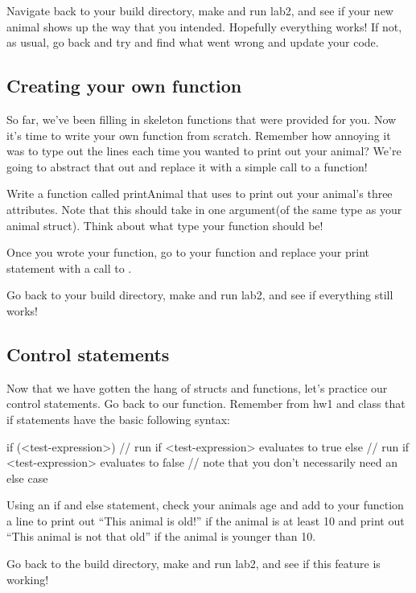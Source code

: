 \documentclass{tufte-handout}
\begin{document}
Navigate back to your build directory, make and run lab2, and see if your new animal shows up the way that you intended.  Hopefully everything works!  If not, as usual, go back and try and find what went wrong and update your code. 



\subsection{Creating your own function}
So far, we've been filling in skeleton functions that were provided for you. Now it's time to write your own function from scratch.  Remember how annoying it was to type out the  lines each time you wanted to print out your animal?  We're going to abstract that out and replace it with a simple call to a function! 

Write a function called printAnimal that uses  to print out your animal's three attributes.  Note that this should take in one argument(of the same type as your animal struct).  Think about what type your function should be!

Once you wrote your function, go to your  function and replace your print statement with a call to .

Go back to your build directory, make and run lab2, and see if everything still works!  

\subsection{Control statements}

Now that we have gotten the hang of structs and functions, let's practice our control statements.  Go back to our  function.  Remember from hw1 and class that if statements have the basic following syntax:
\begin{Code}
    if (<test-expression>) {
        // run if <test-expression> evaluates to true
    } else {
        // run if <test-expression> evaluates to false
        // note that you don't necessarily need an else case
    }
\end{Code}

Using an if and else statement, check your animals age and add to your
 function a line to print out ``This animal is
old!'' if the animal is at least 10 and print out ``This animal is not
that old'' if the animal is younger than 10.   

Go back to the build directory, make and run lab2, and see if this feature is working!  
\end{document}

